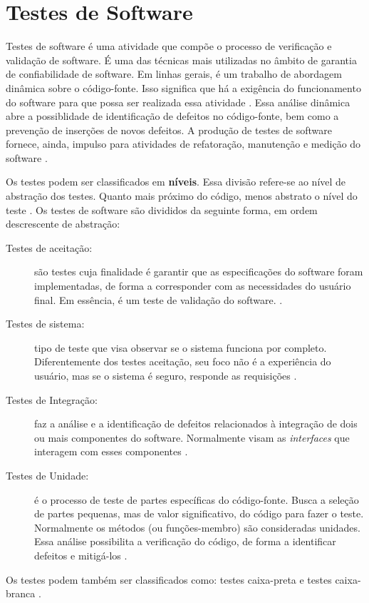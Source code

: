 \section{Testes de Software}
Testes de software é uma atividade que compõe o processo de verificação e validação de software. É uma das técnicas mais utilizadas no âmbito de garantia de confiabilidade de software. Em linhas gerais, é um trabalho de abordagem dinâmica sobre o código-fonte. Isso significa que há a exigência do funcionamento do software para que possa ser realizada essa atividade \cite{barbosaEtAl2009}. Essa análise dinâmica abre a possiblidade de identificação de defeitos no código-fonte, bem como a prevenção de inserções de novos defeitos. A produção de testes de software fornece, ainda, impulso para atividades de refatoração, manutenção e medição do software \cite{barbosaEtAl2009}.
\par
\indent Os testes podem ser classificados em \textbf{níveis}. Essa divisão refere-se ao nível de abstração dos testes. Quanto mais próximo do código, menos abstrato o nível do teste \cite{sommerville2007}. Os testes de software são divididos da seguinte forma, em ordem descrescente de abstração:
\begin{description}
\item[Testes de aceitação:] são testes cuja finalidade é garantir que as especificações do software foram implementadas, de forma a corresponder com as necessidades do usuário final. Em essência, é um teste de validação do software. \cite{sommerville2007}.
\item[Testes de sistema:] tipo de teste que visa observar se o sistema funciona por completo. Diferentemente dos testes aceitação, seu foco não é a experiência do usuário, mas se o sistema é seguro, responde as requisições \cite{sommerville2007}.
\item[Testes de Integração:] faz a análise e a identificação de defeitos relacionados à integração de dois ou mais componentes do software. Normalmente visam as \textit{interfaces} que interagem com esses componentes \cite{sommerville2007}.
\item[Testes de Unidade:] é o processo de teste de partes específicas do código-fonte. Busca a seleção de partes pequenas, mas de valor significativo, do código para fazer o teste. Normalmente os métodos (ou funções-membro) são consideradas unidades. Essa análise possibilita a verificação do código, de forma a identificar defeitos e mitigá-los \cite{sommerville2007}.
\end{description}
\par
\indent Os testes podem também ser classificados como: testes caixa-preta e testes caixa-branca \cite{barbosaEtAl2009}.

